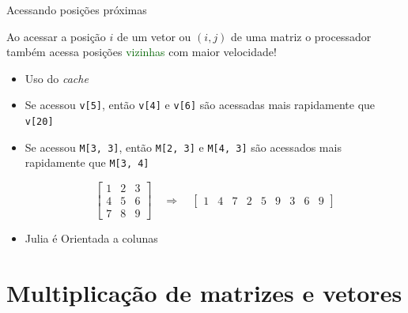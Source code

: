 \documentclass[]{beamer}
\newcommand{\code}[1]{\colorbox[gray]{0.8}{\texttt{#1}}}
\begin{document}
\begin{frame}{Acessando posições próximas}

  Ao acessar a posição $i$ de um vetor ou $(i, j)$ de uma matriz o
  processador também acessa posições \textcolor{darkgreen}{vizinhas}
  com maior velocidade!

  \begin{itemize}
  \item Uso do \emph{cache}

  \item Se acessou \code{v[5]}, então \code{v[4]} e \code{v[6]} são
    acessadas mais rapidamente que \code{v[20]}

  \item Se acessou \code{M[3, 3]}, então \code{M[2, 3]} e \code{M[4,
      3]} são acessados mais rapidamente que \code{M[3, 4]}

    \[
    \begin{bmatrix}
      1 & 2 & 3 \\
      4 & 5 & 6 \\
      7 & 8 & 9
    \end{bmatrix}
    \quad \Rightarrow \quad
    \begin{bmatrix}
      1 & 4 & 7 & 2 & 5 & 9 & 3 & 6 & 9
    \end{bmatrix}
    \]

  \item Julia é \alert{Orientada a colunas}
  \end{itemize}
  
\end{frame}


\section{Multiplicação de matrizes e vetores}
\end{document}
